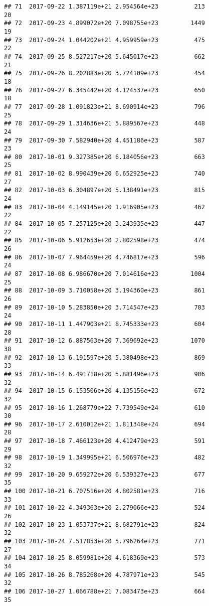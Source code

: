 \documentclass[]{article}
\begin{document}
\begin{verbatim}
## 71  2017-09-22 1.387119e+21 2.954564e+23          213              20
## 72  2017-09-23 4.899072e+20 7.098755e+23         1449              19
## 73  2017-09-24 1.044202e+21 4.959959e+23          475              22
## 74  2017-09-25 8.527217e+20 5.645017e+23          662              21
## 75  2017-09-26 8.202883e+20 3.724109e+23          454              18
## 76  2017-09-27 6.345442e+20 4.124537e+23          650              18
## 77  2017-09-28 1.091823e+21 8.690914e+23          796              25
## 78  2017-09-29 1.314636e+21 5.889567e+23          448              24
## 79  2017-09-30 7.582940e+20 4.451186e+23          587              23
## 80  2017-10-01 9.327385e+20 6.184056e+23          663              25
## 81  2017-10-02 8.990439e+20 6.652925e+23          740              27
## 82  2017-10-03 6.304897e+20 5.138491e+23          815              24
## 83  2017-10-04 4.149145e+20 1.916905e+23          462              22
## 84  2017-10-05 7.257125e+20 3.243935e+23          447              22
## 85  2017-10-06 5.912653e+20 2.802598e+23          474              26
## 86  2017-10-07 7.964459e+20 4.746817e+23          596              24
## 87  2017-10-08 6.986670e+20 7.014616e+23         1004              25
## 88  2017-10-09 3.710058e+20 3.194360e+23          861              26
## 89  2017-10-10 5.283850e+20 3.714547e+23          703              24
## 90  2017-10-11 1.447903e+21 8.745333e+23          604              28
## 91  2017-10-12 6.887563e+20 7.369692e+23         1070              38
## 92  2017-10-13 6.191597e+20 5.380498e+23          869              33
## 93  2017-10-14 6.491718e+20 5.881496e+23          906              32
## 94  2017-10-15 6.153506e+20 4.135156e+23          672              32
## 95  2017-10-16 1.268779e+22 7.739549e+24          610              30
## 96  2017-10-17 2.610012e+21 1.811348e+24          694              28
## 97  2017-10-18 7.466123e+20 4.412479e+23          591              29
## 98  2017-10-19 1.349995e+21 6.506976e+23          482              32
## 99  2017-10-20 9.659272e+20 6.539327e+23          677              35
## 100 2017-10-21 6.707516e+20 4.802581e+23          716              33
## 101 2017-10-22 4.349363e+20 2.279066e+23          524              26
## 102 2017-10-23 1.053737e+21 8.682791e+23          824              32
## 103 2017-10-24 7.517853e+20 5.796264e+23          771              27
## 104 2017-10-25 8.059981e+20 4.618369e+23          573              34
## 105 2017-10-26 8.785268e+20 4.787971e+23          545              32
## 106 2017-10-27 1.066788e+21 7.083473e+23          664              35

\end{verbatim}
\end{document}
